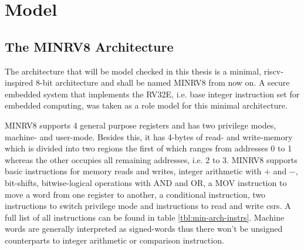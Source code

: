 \section{Model}
\label{sec:model}


\subsection{The MINRV8 Architecture}
\label{sec:minrv8}

The architecture that will be model checked in this thesis is a minimal, \gls{riscv}-inspired 8-bit architecture and shall be named MINRV8 from now on.
A secure embedded system that implements the RV32E, i.e. base integer instruction set for embedded computing, was taken as a role model for this minimal architecture.

MINRV8 supports 4 general purpose registers and has two privilege modes, machine- and user-mode.
Besides this, it has 4-bytes of read- and write-memory which is divided into two regions the first of which ranges from addresses 0 to 1 whereas the other occupies all remaining addresses, i.e. 2 to 3.
MINRV8 supports basic instructions for memory reads and writes, integer arithmetic with $ + $ and $ - $, bit-shifts, bitwise-logical operations with AND and OR, a MOV instruction to move a word from one register to another, a conditional instruction, two instructions to switch privilege mode and instructions to read and write \glspl{csr}.
A full list of all instructions can be found in table \ref{tbl:min-arch-instrs}.
Machine words are generally interpreted as signed-words thus there won't be unsigned counterparts to integer arithmetic or comparison instruction.


